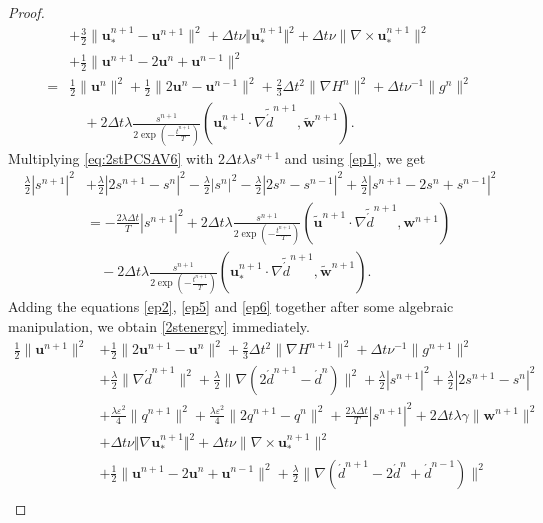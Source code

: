 \documentclass[10pt,a4paper]{amsart}
\newcommand{\dd}{\ensuremath{\acute d}}
\newcommand{\uu}{\mathrm{\textbf{u}}}
\newcommand{\ww}{\mathrm{\textbf{w}}}
\begin{document}
\begin{proof}
\begin{align}
&+\frac{3}{2}\|\uu_*^{n+1}-\uu^{n+1}\|^2+\Delta t\nu\Vert \uu_*^{n+1}\Vert^2+\Delta t\nu\|\nabla\times\uu_*^{n+1}\|^2\nonumber\\
&+\frac{1}{2}\|\uu^{n+1}-2\uu^n+\uu^{n-1}\|^2\nonumber\\
=&\frac{1}{2}\|\uu^{n}\|^2+\frac{1}{2}\|2\uu^{n}-\uu^{n-1}\|^2+\frac{2}{3}\Delta t^2\|\nabla H^{n}\|^2+\Delta t\nu^{-1}\|g^{n}\|^2\nonumber\\
&\quad+2\Delta t\lambda\frac{s^{n+1}}{2\exp\left(-\frac{t^{n+1}}{T}\right)}\left(\uu_*^{n+1}\cdot\nabla\tilde{\dd}^{n+1},\tilde{\ww}^{n+1}\right).
\end{align}
Multiplying \eqref{eq:2stPCSAV6} with $2\Delta t\lambda s^{n+1}$ and using \eqref{ep1}, we get 
\begin{align}\label{ep6}
\frac{\lambda}{2}|s^{n+1}|^2&+\frac{\lambda}{2}|2s^{n+1}-s^{n}|^2-\frac{\lambda}{2}|s^{n}|^2-\frac{\lambda}{2}|2s^{n}-s^{n-1}|^2+\frac{\lambda}{2}|s^{n+1}-2s^n+s^{n-1}|^2\nonumber\\
&=-\frac{2\lambda\Delta t}{T}|s^{n+1}|^2+
2\Delta t\lambda\frac{s^{n+1}}{2\exp\left(-\frac{t^{n+1}}{T}\right)} \left(\tilde{\uu}^{n+1}\cdot\nabla\tilde{\dd}^{n+1},\ww^{n+1}\right)\nonumber\\
&\quad-2\Delta t\lambda\frac{s^{n+1}}{2\exp\left(-\frac{t^{n+1}}{T}\right)} \left(\uu_*^{n+1}\cdot\nabla\tilde{\dd}^{n+1},\tilde{\ww}^{n+1}\right).
\end{align}
Adding the equations \eqref{ep2}, \eqref{ep5} and \eqref{ep6} together after some algebraic manipulation, we obtain \eqref{2stenergy} immediately.
\iffalse
\begin{align}
\frac{1}{2}\|\uu^{n+1}\|^2&+\frac{1}{2}\|2\uu^{n+1}-\uu^n\|^2+\frac{2}{3}\Delta t^2\|\nabla H^{n+1}\|^2+\Delta t\nu^{-1}\|g^{n+1}\|^2\nonumber\\
&+\frac{\lambda}{2}\lVert\nabla\dd^{n+1}\rVert^2
+\frac{\lambda}{2}\lVert\nabla\left(2\dd^{n+1}-\dd^n\right)\rVert^2+\frac{\lambda}{2}|s^{n+1}|^2+\frac{\lambda}{2}|2s^{n+1}-s^{n}|^2\nonumber\\
&+\frac{\lambda\varepsilon^2}{4}\|q^{n+1}\|^2+\frac{\lambda\varepsilon^2}{4}\|2q^{n+1}-q^n\|^2
+\frac{2\lambda\Delta t}{T}|s^{n+1}|^2+2\Delta t\lambda\gamma\|\ww^{n+1}\|^2\nonumber\\
&+\Delta t\nu\Vert \nabla\uu_*^{n+1}\Vert^2+\Delta t\nu\|\nabla\times\uu_*^{n+1}\|^2\nonumber\\
&+\frac{1}{2}\|\uu^{n+1}-2\uu^n+\uu^{n-1}\|^2+\frac{\lambda}{2}\lVert\nabla\left(\dd^{n+1}-2\dd^n+\dd^{n-1}\right)\rVert^2\nonumber\\

\end{align}
\end{proof}
\end{document}

